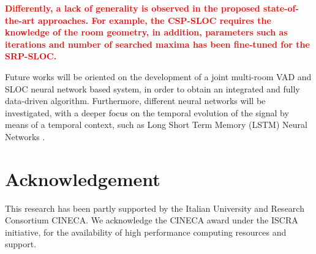 \documentclass[review]{elsarticle}
\begin{document}
\textcolor{red}{\textbf{Differently, a lack of generality is observed in the proposed state-of-the-art approaches. For example, the CSP-SLOC requires the knowledge of the room geometry, in addition, parameters such as iterations and number of searched maxima has been fine-tuned for the SRP-SLOC.}}

Future works will be oriented on the development of a joint multi-room VAD \cite{ijcnn-vad,ijcnn2016-vad} and SLOC neural network based system, in order to obtain an integrated and fully data-driven algorithm.
Furthermore, different neural networks will be investigated, with a deeper focus on the temporal evolution of the signal by means of a temporal context, such as Long Short Term Memory (LSTM) Neural Networks \cite{hochreiter1997long}. 

\section*{Acknowledgement}
This research has been partly supported by the Italian University and Research Consortium CINECA. We acknowledge the CINECA award under the ISCRA initiative, for the availability of high performance computing resources and support.










\end{document}

